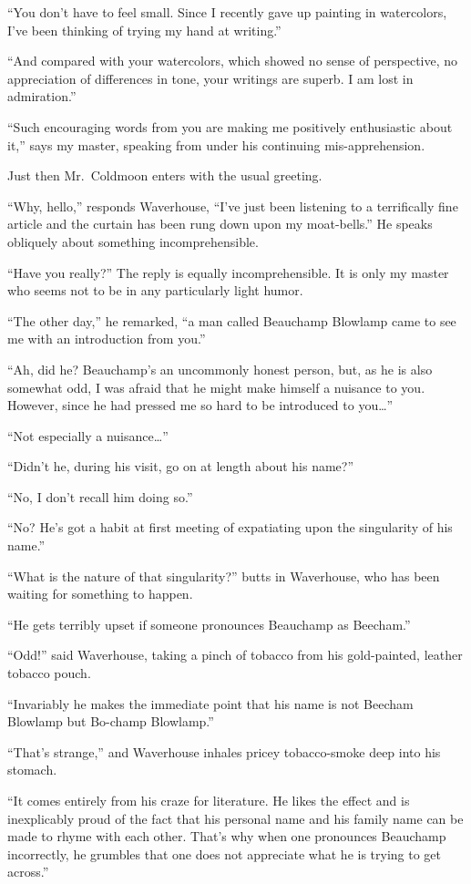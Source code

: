 \documentclass[12pt, openright]{book}
\begin{document}
``You don't have to feel small. Since I recently gave up painting in
watercolors, I've been thinking of trying my hand at writing.''

``And compared with your watercolors, which showed no sense of
perspective, no appreciation of differences in tone, your writings are
superb. I am lost in admiration.''

``Such encouraging words from you are making me positively enthusiastic
about it,'' says my master, speaking from under his continuing
mis-apprehension.

Just then Mr.~Coldmoon enters with the usual greeting.

``Why, hello,'' responds Waverhouse, ``I've just been listening to a
terrifically fine article and the curtain has been rung down upon my
moat-bells.'' He speaks obliquely about something incomprehensible.

``Have you really?'' The reply is equally incomprehensible. It is only
my master who seems not to be in any particularly light humor.

``The other day,'' he remarked, ``a man called Beauchamp Blowlamp came
to see me with an introduction from you.''

``Ah, did he? Beauchamp's an uncommonly honest person, but, as he is
also somewhat odd, I was afraid that he might make himself a nuisance to
you. However, since he had pressed me so hard to be introduced to
you\ldots{}''

``Not especially a nuisance\ldots{}''

``Didn't he, during his visit, go on at length about his name?''

``No, I don't recall him doing so.''

``No? He's got a habit at first meeting of expatiating upon the
singularity of his name.''

``What is the nature of that singularity?'' butts in Waverhouse, who has
been waiting for something to happen.

``He gets terribly upset if someone pronounces Beauchamp as Beecham.''

``Odd!'' said Waverhouse, taking a pinch of tobacco from his
gold-painted, leather tobacco pouch.

``Invariably he makes the immediate point that his name is not Beecham
Blowlamp but Bo-champ Blowlamp.''

``That's strange,'' and Waverhouse inhales pricey tobacco-smoke deep
into his stomach.

``It comes entirely from his craze for literature. He likes the effect
and is inexplicably proud of the fact that his personal name and his
family name can be made to rhyme with each other. That's why when one
pronounces Beauchamp incorrectly, he grumbles that one does not
appreciate what he is trying to get across.''
\end{document}
